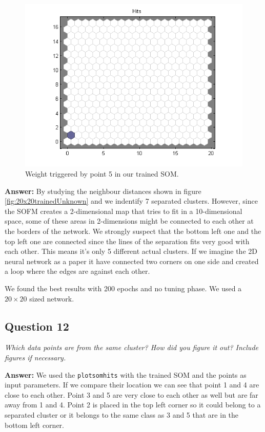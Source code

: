 \documentclass[a4paper]{article}
\begin{document}
 \begin{figure}[H] %
	 \includegraphics[scale=0.5]{point5.png}
	 \caption{\label{fig:point5} Weight triggered by point 5 in our trained SOM.}
 \end{figure}

 \textbf{Answer:} By studying the neighbour distances shown in figure \ref{fig:20x20trainedUnknown} and we indentify 7 separated clusters. However, since the SOFM creates a 2-dimensional map that tries to fit in a 10-dimensional space, some of these areas in 2-dimensions might be connected to each other at the borders of the network. We strongly suspect that the bottom left one and the top left one are connected since the lines of the separation fits very good with each other. This means it's only 5 different actual clusters. If we imagine the 2D neural network as a paper it have connected two corners on one side and created a loop where the edges are against each other. 
 
We found the best results with 200 epochs and no tuning phase. We used a $20 \times 20$ sized network.


\subsection*{Question 12}
\emph{Which data points are from the same cluster? How did you
figure it out? Include figures if necessary.} 

\textbf{Answer:} We used the \texttt{plotsomhits} with the trained SOM and the points as input parameters. If we compare their location we can see that point 1 and 4 are close to each other. Point 3 and 5 are very close to each other as well but are far away from 1 and 4. Point 2 is placed in the top left corner so it could belong to a separated cluster or it belongs to the same class as 3 and 5 that are in the bottom left corner.
\end{document}
